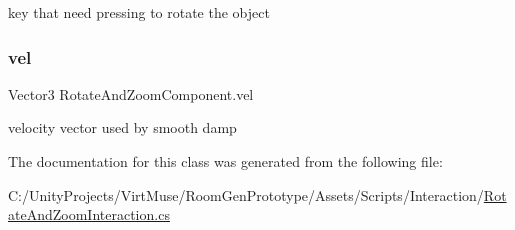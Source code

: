 key that need pressing to rotate the object 

\mbox{\label{class_rotate_and_zoom_component_ad5f4bb60f7d02385cded9602eb48822a}} 
\subsubsection{\texorpdfstring{vel}{vel}}
{\footnotesize\ttfamily Vector3 Rotate\+And\+Zoom\+Component.\+vel\hspace{0.3cm}{\ttfamily [private]}}



velocity vector used by smooth damp 



The documentation for this class was generated from the following file\+:\begin{DoxyCompactItemize}
\item 
C\+:/\+Unity\+Projects/\+Virt\+Muse/\+Room\+Gen\+Prototype/\+Assets/\+Scripts/\+Interaction/\mbox{\hyperlink{_rotate_and_zoom_interaction_8cs}{Rotate\+And\+Zoom\+Interaction.\+cs}}\end{DoxyCompactItemize}
